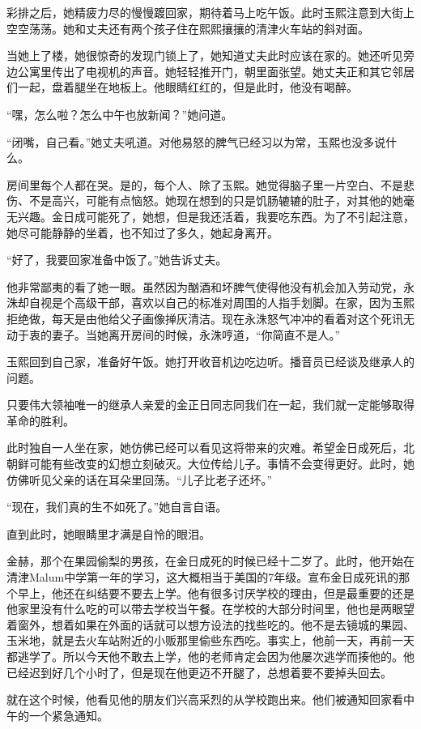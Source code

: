 彩排之后，她精疲力尽的慢慢踱回家，期待着马上吃午饭。此时玉熙注意到大街上空空荡荡。她和丈夫还有两个孩子住在熙熙攘攘的清津火车站的斜对面。

当她上了楼，她很惊奇的发现门锁上了，她知道丈夫此时应该在家的。她还听见旁边公寓里传出了电视机的声音。她轻轻推开门，朝里面张望。她丈夫正和其它邻居们一起，盘着腿坐在地板上。他眼睛红红的，但是此时，他没有喝醉。

“嘿，怎么啦？怎么中午也放新闻？”她问道。

“闭嘴，自己看。”她丈夫吼道。对他易怒的脾气已经习以为常，玉熙也没多说什么。

房间里每个人都在哭。是的，每个人、除了玉熙。她觉得脑子里一片空白、不是悲伤、不是高兴，可能有点恼怒。她现在想到的只是饥肠辘辘的肚子，对其他的她毫无兴趣。金日成可能死了，她想，但是我还活着，我要吃东西。为了不引起注意，她尽可能静静的坐着，也不知过了多久，她起身离开。

“好了，我要回家准备中饭了。”她告诉丈夫。

他非常鄙夷的看了她一眼。虽然因为酗酒和坏脾气使得他没有机会加入劳动党，永洙却自视是个高级干部，喜欢以自己的标准对周围的人指手划脚。在家，因为玉熙拒绝做，每天是由他给父子画像掸灰清洁。现在永洙怒气冲冲的看着对这个死讯无动于衷的妻子。当她离开房间的时候，永洙哼道，“你简直不是人。”

玉熙回到自己家，准备好午饭。她打开收音机边吃边听。播音员已经谈及继承人的问题。

只要伟大领袖唯一的继承人亲爱的金正日同志同我们在一起，我们就一定能够取得革命的胜利。

此时独自一人坐在家，她仿佛已经可以看见这将带来的灾难。希望金日成死后，北朝鲜可能有些改变的幻想立刻破灭。大位传给儿子。事情不会变得更好。此时，她仿佛听见父亲的话在耳朵里回荡。“儿子比老子还坏。”

“现在，我们真的生不如死了。”她自言自语。

直到此时，她眼睛里才满是自怜的眼泪。

金赫，那个在果园偷梨的男孩，在金日成死的时候已经十二岁了。此时，他开始在清津Malum中学第一年的学习，这大概相当于美国的7年级。宣布金日成死讯的那个早上，他还在纠结要不要去上学。他有很多讨厌学校的理由，但是最重要的还是他家里没有什么吃的可以带去学校当午餐。在学校的大部分时间里，他也是两眼望着窗外，想着如果在外面的话就可以想方设法的找些吃的。他不是去镜城的果园、玉米地，就是去火车站附近的小贩那里偷些东西吃。事实上，他前一天，再前一天都逃学了。所以今天他不敢去上学，他的老师肯定会因为他屡次逃学而揍他的。他已经迟到好几个小时了，但是现在他更迈不开腿了，总想着要不要掉头回去。

就在这个时候，他看见他的朋友们兴高采烈的从学校跑出来。他们被通知回家看中午的一个紧急通知。

